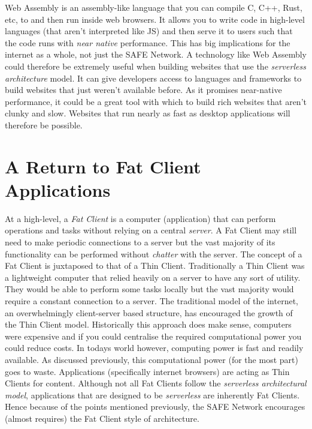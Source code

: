Web Assembly is an assembly-like language that you can compile C, C++, Rust, etc, to and then run inside web browsers. It allows you to write code in high-level languages (that aren't interpreted like JS) and then serve it to users such that the code runs with \textit{near native} performance. This has big implications for the internet as a whole, not just the SAFE Network. A technology like Web Assembly could therefore be extremely useful when building websites that use the \textit{serverless architecture} model. It can give developers access to languages and frameworks to build websites that just weren't available before. As it promises near-native performance, it could be a great tool with which to build rich websites that aren't clunky and slow. Websites that run nearly as fast as desktop applications will therefore be possible.

\section{A Return to Fat Client Applications}

At a high-level, a \textit{Fat Client} is a computer (application) that can perform operations and tasks without relying on a central \textit{server}. A Fat Client may still need to make periodic connections to a server but the vast majority of its functionality can be performed without \textit{chatter} with the server. The concept of a Fat Client is juxtaposed to that of a Thin Client. Traditionally a Thin Client was a lightweight computer that relied heavily on a server to have any sort of utility. They would be able to perform some tasks locally but the vast majority would require a constant connection to a server. The traditional model of the internet, an overwhelmingly client-server based structure, has encouraged the growth of the Thin Client model. Historically this approach does make sense, computers were expensive and if you could centralise the required computational power you could reduce costs. In todays world however, computing power is fast and readily available. As discussed previously, this computational power (for the most part) goes to waste. Applications (specifically internet browsers) are acting as Thin Clients for content. Although not all Fat Clients follow the \textit{serverless architectural model}, applications that are designed to be \textit{serverless} are inherently Fat Clients. Hence because of the points mentioned previously, the SAFE Network encourages (almost requires) the Fat Client style of architecture.

